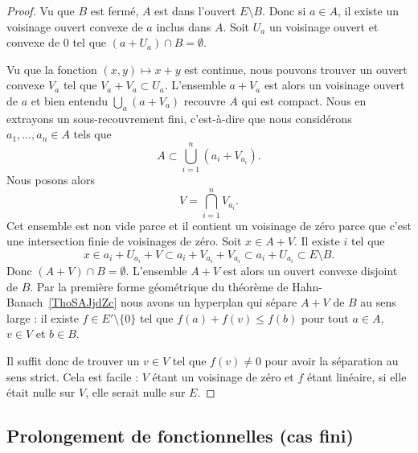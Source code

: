 \begin{proof}
    Vu que \( B\) est fermé, \( A\) est dans l'ouvert \( E\setminus B\). Donc si \( a\in A\), il existe un voisinage ouvert convexe de \( a\) inclus dans \( A\). Soit \( U_a\) un voisinage ouvert et convexe de \( 0\) tel que \( (a+U_a)\cap B=\emptyset\).

    Vu que la fonction \( (x,y)\mapsto x+y\) est continue, nous pouvons trouver un ouvert convexe \( V_a\) tel que \( V_a+V_a\subset U_a\). L'ensemble \( a+V_a\) est alors un voisinage ouvert de \( a\) et bien entendu \( \bigcup_a(a+V_a)\) recouvre \( A\) qui est compact. Nous en extrayons un sous-recouvrement fini, c'est-à-dire que nous considérons \( a_1,\ldots, a_n\in A\) tels que
    \begin{equation}
        A\subset \bigcup_{i=1}^n(a_i+V_{a_i}).
    \end{equation}
    Nous posons alors
    \begin{equation}
        V=\bigcap_{i=1}^nV_{a_i}.
    \end{equation}
    Cet ensemble est non vide parce et il contient un voisinage de zéro parce que c'est une intersection finie de voisinages de zéro. Soit \( x\in A+V\). Il existe \( i\) tel que
    \begin{equation}
        x\in a_i+U_{a_i}+V\subset a_i+V_{a_i}+V_{a_i}\subset a_i+U_{a_i}\subset E\setminus B.
    \end{equation}
    Donc \( (A+V)\cap B=\emptyset\). L'ensemble \( A+V\) est alors un ouvert convexe disjoint de \( B\). Par la première forme géométrique du théorème de Hahn-Banach~\ref{ThoSAJjdZc} nous avons un hyperplan qui sépare \( A+V\) de \( B\) au sens large : il existe \( f\in E'\setminus\{ 0 \}\) tel que \( f(a)+f(v)\leq f(b)\) pour tout \( a\in A\), \( v\in V\) et \( b\in B\).

    Il suffit donc de trouver un \( v\in V\) tel que \( f(v)\neq 0\) pour avoir la séparation au sens strict. Cela est facile : \( V\) étant un voisinage de zéro et \( f\) étant linéaire, si elle était nulle sur \( V\), elle serait nulle sur \( E\).
\end{proof}

\subsection{Prolongement de fonctionnelles (cas fini)}

